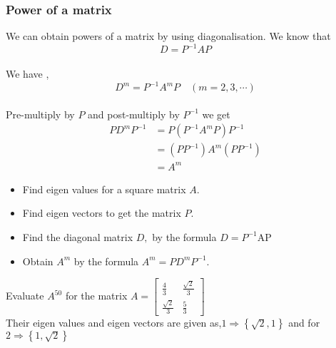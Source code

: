 \subsubsection{Power of a matrix}
We can obtain powers of a matrix by using diagonalisation.
We know that
$$
D=P^{-1} A P
$$
\\We have ,\ $${D}^{m}={P}^{-1} {A}^{m} {P} \quad(m=2,3, \cdots)$$
\\Pre-multiply by $P$ and post-multiply by $P^{-1}$ we get\\
$$
\begin{aligned}
	P D^{m} P^{-1} &=P\left(P^{-1} A^{m} P\right) P^{-1} \\
	&=\left(P P^{-1}\right) A^{m}\left(P P^{-1}\right) \\
	&=A^{m}
\end{aligned}
$$
\begin{itemize}
	\item  Find eigen values for a square matrix $A$.
	\item  Find eigen vectors to get the matrix $P$.
	\item  Find the diagonal matrix $D,$ by the formula $D=P^{-1} \mathrm{AP}$
	\item  Obtain $A^{m}$ by the formula $A^{m}=P D^{m} P^{-1}$.
\end{itemize}
\begin{exercise}
	Evaluate $A^{50}$ for the matrix $A=\left[ \begin{array}{cc}
	\frac{4}{3}& \frac{\sqrt{2}}{3}\\
	\frac{\sqrt{2}}{3}& \frac{5}{3} 
	\end{array}\right]$\\Their eigen values and eigen vectors are given as,$1\Longrightarrow \left\lbrace \sqrt{2},1\right\rbrace $ and for $2\Longrightarrow \left\lbrace  1,\sqrt{2}\right\rbrace $\end{exercise}
